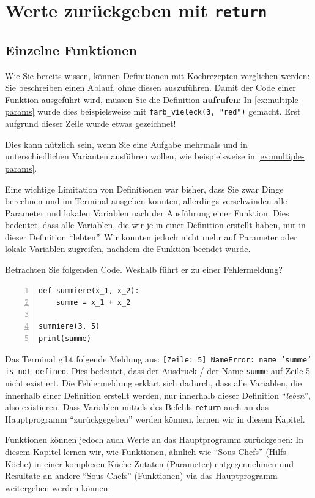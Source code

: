\section{Werte zurückgeben mit \texorpdfstring{\lstinline|return|}{return}}
\subsection{Einzelne Funktionen}
Wie Sie bereits wissen, können Definitionen mit Kochrezepten verglichen werden: Sie beschreiben einen Ablauf, ohne diesen auszuführen. Damit der Code einer Funktion ausgeführt wird, müssen Sie die Definition \textbf{aufrufen}: In \cref{ex:multiple-params} wurde dies beispielsweise mit \lstinline|farb_vieleck(3, "red")| gemacht. Erst aufgrund dieser Zeile wurde etwas gezeichnet!

Dies kann nützlich sein, wenn Sie eine Aufgabe mehrmals und in unterschiedlichen Varianten ausführen wollen, wie beispielsweise in \cref{ex:multiple-params}.

Eine wichtige Limitation von Definitionen war bisher, dass Sie zwar Dinge berechnen und im Terminal ausgeben konnten, allerdings verschwinden alle Parameter und lokalen Variablen nach der Ausführung einer Funktion.  Dies bedeutet, dass alle Variablen, die wir je in einer Definition erstellt haben, nur in dieser Definition \enquote{lebten}. Wir konnten jedoch nicht mehr auf Parameter oder lokale Variablen zugreifen, nachdem die Funktion beendet wurde.

\begin{myexample}\label{ex:sum-noreturn}
Betrachten Sie folgenden Code. Weshalb führt er zu einer Fehlermeldung?
\begin{lstlisting}[numbers=left]
def summiere(x_1, x_2):
    summe = x_1 + x_2

summiere(3, 5)
print(summe)
\end{lstlisting}
Das Terminal gibt folgende Meldung aus: \texttt{[Zeile: 5] NameError: name 'summe' is not defined}. Dies bedeutet, dass der Ausdruck / der Name \lstinline|summe| auf Zeile 5 nicht existiert. Die Fehlermeldung erklärt sich dadurch, dass alle Variablen, die innerhalb einer Definition erstellt werden, nur innerhalb dieser Definition \enquote{\textit{leben}}, also existieren. Dass Variablen mittels des Befehls \lstinline|return| auch an das Hauptprogramm \enquote{zurückgegeben} werden können, lernen wir in diesem Kapitel.
\end{myexample}

Funktionen können jedoch auch Werte an das Hauptprogramm zurückgeben: In diesem Kapitel lernen wir, wie Funktionen, ähnlich wie \enquote{Sous-Chefs} (Hilfs-Köche) in einer komplexen Küche Zutaten (Parameter) entgegennehmen und Resultate an andere \enquote{Sous-Chefs} (Funktionen) via das Hauptprogramm weitergeben werden können.

